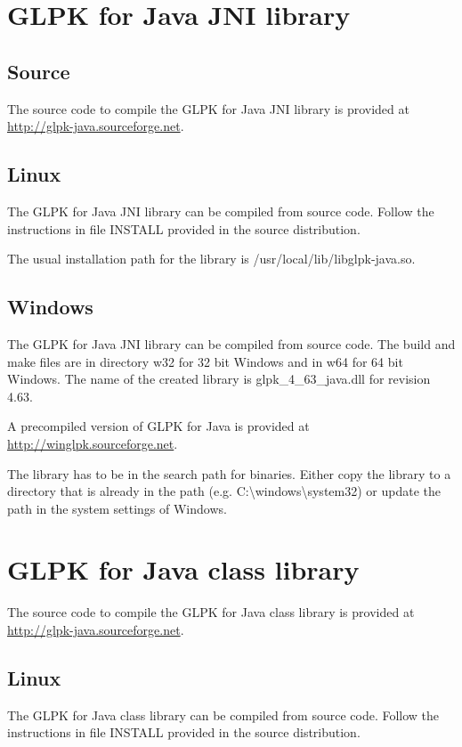 \documentclass[a4paper,11pt]{report}
\newcommand{\glpkVersionMajor}{4}
\newcommand{\glpkVersionMinor}{63}
\begin{document}
\section{GLPK for Java JNI library}
\subsection{Source}
The source code to compile the GLPK for Java JNI library is provided at \linebreak\href{http://glpk-java.sourceforge.net}{http://glpk-java.sourceforge.net}.

\subsection{Linux}
The GLPK for Java JNI library can be compiled from source code. Follow the instructions in file INSTALL provided in the source distribution.

The usual installation path for the library is /usr/local/lib/libglpk-java.so.
\subsection{Windows}
The GLPK for Java JNI library can be compiled from source code. The build and make files are in directory w32 for 32 bit Windows and in w64 for 64 bit Windows. The name of the created library is glpk\_\glpkVersionMajor\_\glpkVersionMinor\_java.dll for revision \glpkVersionMajor.\glpkVersionMinor.

A precompiled version of GLPK for Java is provided at \linebreak\href{http://winglpk.sourceforge.net}{http://winglpk.sourceforge.net}.

The library has to be in the search path for binaries. Either copy the library to a directory that is already in the path (e.g. C:\textbackslash windows\textbackslash system32) or update the path in the system settings of Windows.

\section{GLPK for Java class library}
The source code to compile the GLPK for Java class library is provided at \linebreak\href{http://glpk-java.sourceforge.net}{http://glpk-java.sourceforge.net}.

\subsection{Linux}
The GLPK for Java class library can be compiled from source code. Follow the instructions in file INSTALL provided in the source distribution.
\end{document}
